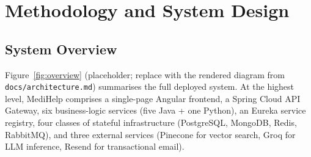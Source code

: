 \documentclass[12pt]{caltech_thesis}
\begin{document}
\chapter{Methodology and System Design}
\label{ch:method}

\section{System Overview}

Figure~\ref{fig:overview} (placeholder; replace with the rendered diagram
from \texttt{docs/architecture.md}) summarises the full deployed system.
At the highest level, MediHelp comprises a single-page Angular frontend, a
Spring Cloud API Gateway, six business-logic services (five Java + one
Python), an Eureka service registry, four classes of stateful
infrastructure (PostgreSQL, MongoDB, Redis, RabbitMQ), and three external
services (Pinecone for vector search, Groq for LLM inference, Resend for
transactional email).
\end{document}
